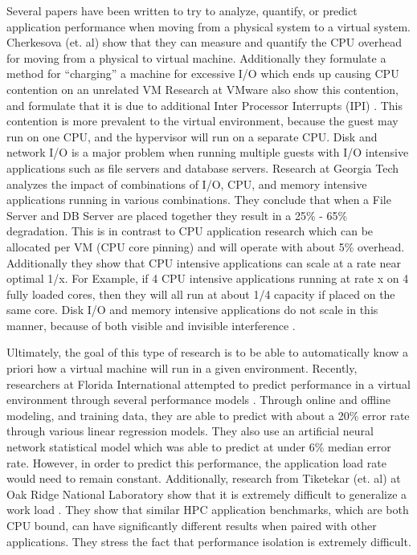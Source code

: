 Several papers have been written to try to analyze, quantify, or predict application performance when moving from a physical system to a virtual system.   Cherkesova (et. al) show that they can measure and quantify the CPU overhead for moving from a physical to virtual machine.  Additionally they formulate a method for “charging” a machine for excessive I/O which ends up causing CPU contention on an unrelated VM \cite{cherkasova}  Research at VMware also show this contention, and formulate that it is due to additional Inter Processor Interrupts (IPI) \cite{ahmad}.   This contention is more prevalent to the virtual environment, because the guest may run on one CPU, and the hypervisor will run on a separate CPU.  
\indent Disk and network I/O is a major problem when running multiple guests with I/O intensive applications such as file servers and database servers.  Research at Georgia Tech \cite{paul} analyzes the impact of combinations of I/O, CPU, and memory intensive applications running in various combinations.  They conclude that when a File Server and DB Server are placed together they result in a 25\% - 65\% degradation.  This is in contrast to CPU application research \cite{huber1, huber2} which can be allocated per VM (CPU core pinning) and will operate with about 5\% overhead.  Additionally they show that CPU intensive applications can scale at a rate near optimal 1/x.   For Example, if 4 CPU intensive applications running at rate x on 4 fully loaded cores, then they will all run at about 1/4 capacity if placed on the same core.   Disk I/O and memory intensive applications do not scale in this manner, because of both visible and invisible interference \cite{tickoo}.

\indent Ultimately, the goal of this type of research is to be able to automatically know a priori how a virtual machine will run in a given environment.  Recently, researchers at Florida International attempted to predict performance in a virtual environment through several performance models \cite{kundu}.  Through online and offline modeling, and training data, they are able to predict with about a 20\% error rate through various linear regression models.  They also use an artificial neural network statistical model which was able to predict at under 6\% median error rate.   However, in order to predict this performance, the application load rate would need to remain constant.   Additionally, research from Tiketekar (et. al) at Oak Ridge National Laboratory show that it is extremely difficult to generalize a work load \cite{tikotekar}.  They show that similar HPC application benchmarks, which are both CPU bound, can have significantly different results when paired with other applications.  They stress the fact that performance isolation is extremely difficult.

